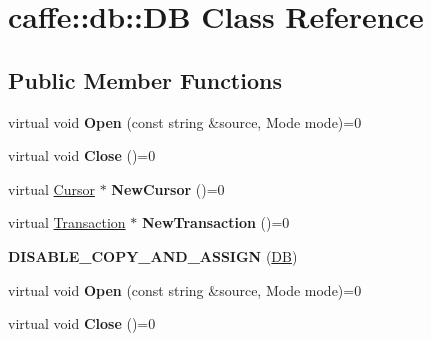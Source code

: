 \hypertarget{classcaffe_1_1db_1_1_d_b}{}\section{caffe\+:\+:db\+:\+:DB Class Reference}
\label{classcaffe_1_1db_1_1_d_b}
\subsection*{Public Member Functions}
\begin{DoxyCompactItemize}
\item 
\mbox{\label{classcaffe_1_1db_1_1_d_b_acb14bf3840539c0ce5bfd294f31adb67}} 
virtual void {\bfseries Open} (const string \&source, Mode mode)=0
\item 
\mbox{\label{classcaffe_1_1db_1_1_d_b_a1eea40ee9e2017c2aa983e88770486fc}} 
virtual void {\bfseries Close} ()=0
\item 
\mbox{\label{classcaffe_1_1db_1_1_d_b_a5bf502b15bfb2f8fbbf1670bf1a2e93b}} 
virtual \mbox{\hyperlink{classcaffe_1_1db_1_1_cursor}{Cursor}} $\ast$ {\bfseries New\+Cursor} ()=0
\item 
\mbox{\label{classcaffe_1_1db_1_1_d_b_a346f1668d90dc24492ffc0d2d9f7097c}} 
virtual \mbox{\hyperlink{classcaffe_1_1db_1_1_transaction}{Transaction}} $\ast$ {\bfseries New\+Transaction} ()=0
\item 
\mbox{\label{classcaffe_1_1db_1_1_d_b_aaffc660573d0b233cb2dfecf2e3aabae}} 
{\bfseries D\+I\+S\+A\+B\+L\+E\+\_\+\+C\+O\+P\+Y\+\_\+\+A\+N\+D\+\_\+\+A\+S\+S\+I\+GN} (\mbox{\hyperlink{classcaffe_1_1db_1_1_d_b}{DB}})
\item 
\mbox{\label{classcaffe_1_1db_1_1_d_b_acb14bf3840539c0ce5bfd294f31adb67}} 
virtual void {\bfseries Open} (const string \&source, Mode mode)=0
\item 
\mbox{\label{classcaffe_1_1db_1_1_d_b_a1eea40ee9e2017c2aa983e88770486fc}} 
virtual void {\bfseries Close} ()=0
\item 
\mbox{\label{classcaffe_1_1db_1_1_d_b_a5bf502b15bfb2f8fbbf1670bf1a2e93b}} 

\end{DoxyCompactItemize}
